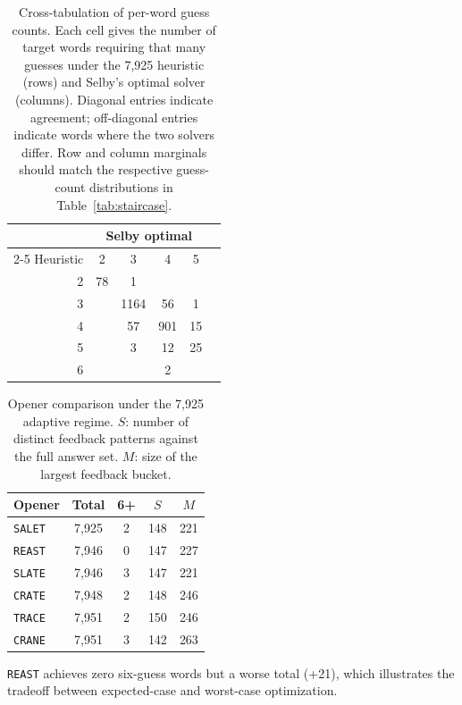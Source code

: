 \documentclass[11pt]{article}
\begin{document}
	\begin{table}[h]
		\centering
		\caption{Cross-tabulation of per-word guess counts. Each cell gives the number of target words requiring that many guesses under the 7,925 heuristic (rows) and Selby's optimal solver (columns). Diagonal entries indicate agreement; off-diagonal entries indicate words where the two solvers differ.  Row and column marginals should match the respective guess-count distributions in Table~\ref{tab:staircase}.}
		\label{tab:crosstab}
		\begin{tabular}{@{}rccccc@{}}
			\toprule
			& \multicolumn{4}{c}{Selby optimal} \\
			\cmidrule(l){2-5}
			Heuristic & 2 & 3 & 4 & 5 \\
			\midrule
			2 & 78 & 1 &      &    \\
			3 &    & 1164 & 56 & 1  \\
			4 &    & 57 & 901  & 15 \\
			5 &    & 3  & 12   & 25 \\
			6 &    &    & 2    &    \\
			\bottomrule
		\end{tabular}
	\end{table}
	
	\begin{table}[h]
		\centering
		\caption{Opener comparison under the 7,925 adaptive regime. $S$: number of distinct feedback patterns against the full answer set. $M$: size of the largest feedback bucket.}
		\label{tab:opener}
		\begin{tabular}{@{}lcccc@{}}
			\toprule
			Opener & Total & 6+ & $S$ & $M$ \\
			\midrule
			\texttt{SALET} & 7,925 & 2 & 148 & 221 \\
			\texttt{REAST} & 7,946 & 0 & 147 & 227 \\
			\texttt{SLATE} & 7,946 & 3 & 147 & 221 \\
			\texttt{CRATE} & 7,948 & 2 & 148 & 246 \\
			\texttt{TRACE} & 7,951 & 2 & 150 & 246 \\
			\texttt{CRANE} & 7,951 & 3 & 142 & 263 \\
			\bottomrule
		\end{tabular}
	\end{table}
	
	\texttt{REAST} achieves zero six-guess words but a worse total (+21), which illustrates the tradeoff between expected-case and worst-case optimization.
	
\end{document}
